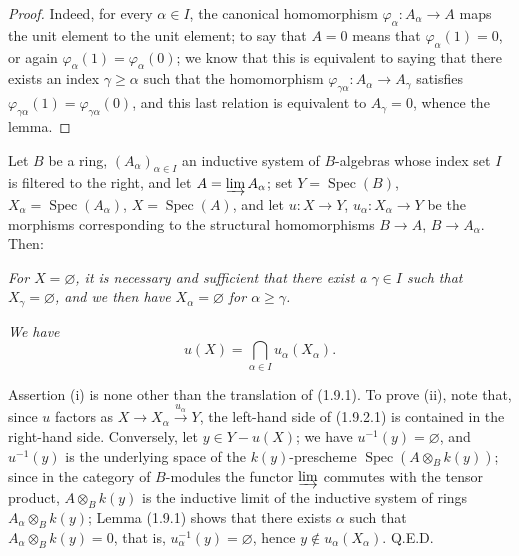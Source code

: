 \begin{proof}
Indeed, for every $\alpha\in I$, the canonical homomorphism
$\varphi_\alpha:A_\alpha\to A$ maps the unit element to the unit element;
to say that $A=0$ means that $\varphi_\alpha(1)=0$, or again
$\varphi_\alpha(1)=\varphi_\alpha(0)$; we know that this is equivalent to
saying that there exists an index $\gamma\geq\alpha$ such that the
homomorphism $\varphi_{\gamma\alpha}:A_\alpha\to A_\gamma$ satisfies
$\varphi_{\gamma\alpha}(1)=\varphi_{\gamma\alpha}(0)$, and this last
relation is equivalent to $A_\gamma=0$, whence the lemma.
\end{proof}

\begin{proposition}[1.9.2]
\label{IV.1.9.2}
Let $B$ be a ring, $(A_\alpha)_{\alpha\in I}$ an inductive system of
$B$-algebras whose index set $I$ is filtered to the right, and let
$A=\varinjlim A_\alpha$; set $Y=\operatorname{Spec}(B)$,
$X_\alpha=\operatorname{Spec}(A_\alpha)$, $X=\operatorname{Spec}(A)$, and
let $u:X\to Y$, $u_\alpha:X_\alpha\to Y$ be the morphisms corresponding to
the structural homomorphisms $B\to A$, $B\to A_\alpha$. Then:
\end{proposition}

\begin{env}[1.9.2.i]
\label{IV.1.9.2.i}
\emph{For $X=\varnothing$, it is necessary and sufficient that there exist a
$\gamma\in I$ such that $X_\gamma=\varnothing$, and we then have
$X_\alpha=\varnothing$ for $\alpha\geq\gamma$.}
\end{env}


\begin{env}[1.9.2.ii]
\label{IV.1.9.2.ii}
\emph{We have}
\[
  u(X)=\bigcap_{\alpha\in I}u_\alpha(X_\alpha). \tag{1.9.2.1}
  \label{IV.1.9.2.1}
\]
\end{env}

Assertion (i) is none other than the translation of (1.9.1). To prove
(ii), note that, since $u$ factors as
$X\to X_\alpha\xrightarrow{u_\alpha}Y$, the left-hand side of (1.9.2.1) is
contained in the right-hand side. Conversely, let $y\in Y-u(X)$; we have
$u^{-1}(y)=\varnothing$, and $u^{-1}(y)$ is the underlying space of the
$k(y)$-prescheme $\operatorname{Spec}(A\otimes_Bk(y))$; since in the
category of $B$-modules the functor $\varinjlim$ commutes with the tensor
product, $A\otimes_Bk(y)$ is the inductive limit of the inductive system of
rings $A_\alpha\otimes_Bk(y)$; Lemma (1.9.1) shows that there exists $\alpha$
such that $A_\alpha\otimes_Bk(y)=0$, that is,
$u_\alpha^{-1}(y)=\varnothing$, hence $y\notin u_\alpha(X_\alpha)$. Q.E.D.

